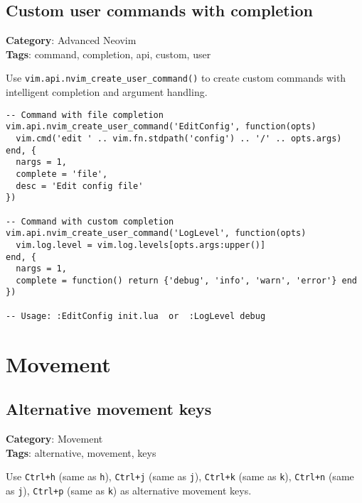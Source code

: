 {{{{{{\section{Custom user commands with completion}

\textbf{Category}: Advanced Neovim\\ \textbf{Tags}: command, completion, api, custom, user
\vspace{0.5cm}

Use {\footnotesize \Verb§vim.api.nvim_create_user_command()§} to create custom commands with intelligent completion and argument handling.

\begin{Exa*}{}
\begin{Verbatim}[fontsize=\footnotesize, breaklines, breakanywhere]
-- Command with file completion
vim.api.nvim_create_user_command('EditConfig', function(opts)
  vim.cmd('edit ' .. vim.fn.stdpath('config') .. '/' .. opts.args)
end, {
  nargs = 1,
  complete = 'file',
  desc = 'Edit config file'
})

-- Command with custom completion
vim.api.nvim_create_user_command('LogLevel', function(opts)
  vim.log.level = vim.log.levels[opts.args:upper()]
end, {
  nargs = 1,
  complete = function() return {'debug', 'info', 'warn', 'error'} end
})

-- Usage: :EditConfig init.lua  or  :LogLevel debug
\end{Verbatim}
\end{Exa*}

\chapter{Movement}
\section{Alternative movement keys}

\textbf{Category}: Movement\\ \textbf{Tags}: alternative, movement, keys
\vspace{0.5cm}

Use {\footnotesize \Verb§Ctrl+h§} (same as {\footnotesize \Verb§h§}), {\footnotesize \Verb§Ctrl+j§} (same as {\footnotesize \Verb§j§}), {\footnotesize \Verb§Ctrl+k§} (same as {\footnotesize \Verb§k§}), {\footnotesize \Verb§Ctrl+n§} (same as {\footnotesize \Verb§j§}), {\footnotesize \Verb§Ctrl+p§} (same as {\footnotesize \Verb§k§}) as alternative movement keys.

}}}}}}
